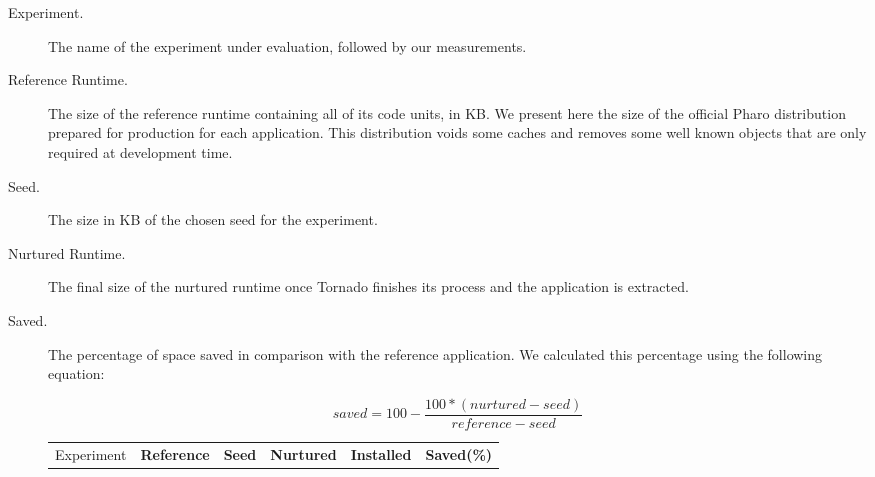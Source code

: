 \begin{description}
\item[Experiment.] The name of the experiment under evaluation, followed by our measurements.
\item[Reference Runtime.] The size of the reference runtime containing all of its code units, in KB. We present here the size of the official Pharo distribution prepared for production for each application. This distribution voids some caches and removes some well known objects that are only required at development time.
\item[Seed.] The size in KB of the chosen seed for the experiment.
\item[Nurtured Runtime.] The final size of the nurtured runtime once Tornado finishes its process and the application is extracted.
\item[Saved.] The percentage of space saved in comparison with the reference application. We calculated this percentage using the following equation:

\begin{equation*}
saved = 100 - \frac{100*(nurtured - seed)}{reference - seed}
\end{equation*}

\begin{table}[ht]
 	\centering
 	\begin{tabular}{lccccc}
		\toprule
			Experiment
 			& \textbf{Reference}
			& \textbf{Seed}
			& \textbf{Nurtured}
			& \textbf{Installed}
			& \textbf{Saved(\%)}\\
			

\end{tabular}
\end{table}
\end{description}
